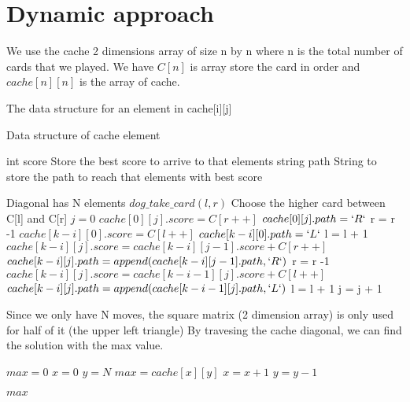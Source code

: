 \documentclass{article}
\begin{document}
\section{Dynamic approach}

We use the cache 2 dimensions array of size n by n where n is the total number of cards that we played. We have $C[n]$ is array store the card in order and $cache[n][n]$ is the array of cache.

The data structure for an element in cache[i][j]
\begin{algorithm}[H]
\begin{algorithmic}
\caption{Data structure of cache element}
\State int score \Comment Store the best score to arrive to that elements
\State string path \Comment String to store the path to reach that elements with best score
\end{algorithmic}
\end{algorithm}
\begin{algorithm}[H]
\begin{algorithmic}
\caption{}
 \Comment Diagonal has N elements
	\State $dog\_take\_card(l,r)$ \Comment Choose the higher card between C[l] and C[r]
	\State $j = 0$
			\State $cache[0][j].score = C[r++]$
			\State $cache[0][j].path = `R`$
			\State r = r -1
			\State $cache[k-i][0].score = C[l++]$ 
			\State $cache[k-i][0].path = `L`$
			\State l = l + 1
		\Else 
				\State $cache[k-i][j].score = cache[k-i][j-1].score + C[r++]$
				\State $cache[k-i][j].path = append(cache[k-i][j-1].path,`R`)$
				\State r = r -1		
			\Else 
				\State $cache[k-i][j].score = cache[k-i-1][j].score + C[l++]$
				\State $cache[k-i][j].path = append(cache[k-i-1][j].path,`L`)$	
				\State l = l + 1
			\EndIf 
		\EndIf
		\State j = j + 1
	\EndFor
\EndFor
\EndProcedure
\end{algorithmic}
\end{algorithm}

Since we only have N moves, the square matrix (2 dimension array) is only used for half of it (the upper left triangle)
By travesing the cache diagonal, we can find the solution with the max value.

\begin{algorithm}[H]
\begin{algorithmic}
\caption{}
\State $max = 0$
	\State $x = 0$	
	\State $y = N$	
		\State $max = cache[x][y]$	
	\EndIf
	\State $x = x + 1$
	\State $y = y - 1$	
\EndFor

\Return $max$
\EndProcedure
\end{algorithmic}
\end{algorithm}
\end{document}
